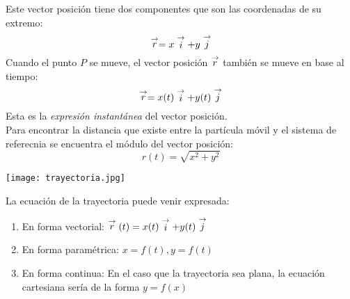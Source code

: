 \begin{center}
\end{center}
Este vector posición tiene dos componentes que son las coordenadas de su extremo:
$$\stackrel{\to}{r} = x\stackrel{\to}{i} + y\stackrel{\to}{j}$$
Cuando el punto $P$ se mueve, el vector posición $\stackrel{\to}{r}$ también se mueve en base al tiempo:
$$\stackrel{\to}{r} = x(t)\stackrel{\to}{i} + y(t)\stackrel{\to}{j}$$
Esta es la \emph{expresión instantánea} del vector posición.\\
Para encontrar la distancia que existe entre la partícula móvil y el sistema de referecnia se encuentra el módulo del vector posición:
$$r(t) = \sqrt{x^2 + y^2}$$

\begin{center}
    \texttt{[image: trayectoria.jpg]}
\end{center}
La ecuación de la trayectoria puede venir expresada:
\begin{enumerate}
    \item En forma vectorial: $\stackrel{\to}{r}(t) = x(t)\stackrel{\to}{i} + y(t)\stackrel{\to}{j}$
    \item En forma paramétrica: $x = f(t), y = f(t)$
    \item En forma continua: En el caso que la trayectoria sea plana, la ecuación cartesiana sería de la forma $y = f(x)$
\end{enumerate}

